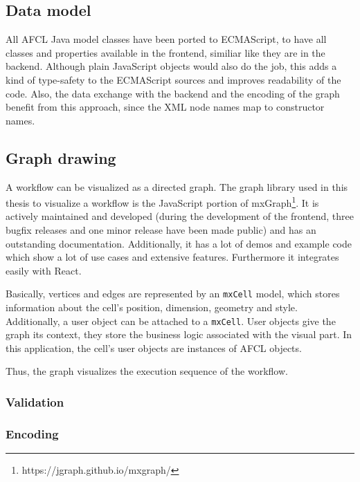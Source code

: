 \documentclass[a4paper,11pt,pdftex,halfparskip,cleardoubleempty,bibtotoc,liststotoc]{scrbook}
\begin{document}
\subsection{Data model}

All AFCL Java model classes have been ported to ECMAScript, to have all classes and properties available in the frontend, similiar like they are in the backend. Although plain JavaScript objects would also do the job, this adds a kind of type-safety to the ECMAScript sources and improves readability of the code. Also, the data exchange with the backend and the encoding of the graph benefit from this approach, since the XML node names map to constructor names.

\subsection{Graph drawing}

A workflow can be visualized as a directed graph.
The graph library used in this thesis to visualize a workflow is the JavaScript portion of mxGraph\footnote{https://jgraph.github.io/mxgraph/}. It is actively maintained and developed (during the development of the frontend, three bugfix releases and one minor release have been made public) and has an outstanding documentation. Additionally, it has a lot of demos and example code which show a lot of use cases and extensive features. Furthermore it integrates easily with React.

Basically, vertices and edges are represented by an \texttt{mxCell} model, which stores information about the cell's position, dimension, geometry and style.
Additionally, a user object can be attached to a \texttt{mxCell}. User objects give the graph its context, they store the business logic associated with the visual part. In this application, the cell's user objects are instances of AFCL objects.

Thus, the graph visualizes the execution sequence of the workflow.


\subsubsection{Validation}

\subsubsection{Encoding}
\end{document}
